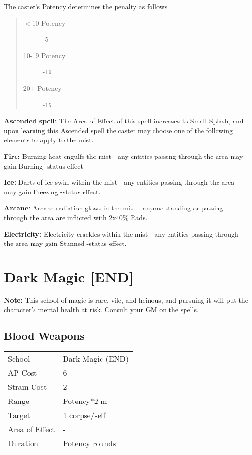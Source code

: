 \documentclass[11pt,a4paper,twocolumn]{book}
\begin{document}
The caster's Potency determines the penalty as follows:

\begin{quote}
	\begin{description}
		\item[$<$10 Potency] 	-5
		\item[10-19 Potency] 	-10
		\item[20+ Potency] 		-15 
	\end{description}
\end{quote}

\bigskip

\textbf{Ascended spell:} The Area of Effect of this spell increases to Small Splash, and upon learning this Ascended spell the caster may choose one of the following elements to apply to the mist:

\smallskip

\begin{compactitem}
	\item \textbf{Fire:} Burning heat engulfs the mist - any entities passing through the area may gain Burning -status effect.
	\item \textbf{Ice:} Darts of ice swirl within the mist - any entities passing through the area may gain Freezing -status effect.
	\item \textbf{Arcane:} Arcane radiation glows in the mist - anyone standing or passing through the area are inflicted with 2x40\% Rads.
	\item \textbf{Electricity:} Electricity crackles within the mist - any entities passing through the area may gain Stunned -status effect.
\end{compactitem}


\section*{Dark Magic [END]}
\textbf{Note:} This school of magic is rare, vile, and heinous, and pursuing it will put the character's mental health at risk. Consult your GM on the spells.

\subsection*{Blood Weapons}
{
	\begin{tabu} to 75mm{| X[l,4] | X[l,7] |}
		\hline
		School 			& Dark Magic (END) 		\\
		AP Cost	      	& 6 					\\
		Strain Cost     & 2 					\\
		Range     		& Potency*2 m				\\
		Target      	& 1 corpse/self 		\\
		Area of Effect  & - 	 				\\
		Duration     	& Potency rounds 		\\ \hline
	\end{tabu}
	
}
\end{document}
